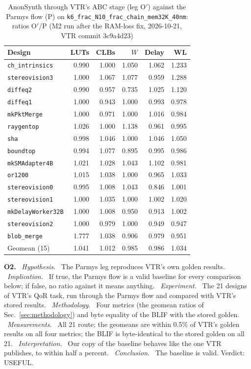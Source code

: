 \documentclass[conference]{IEEEtran}
\newcommand{\code}[1]{\texttt{#1}}
\newcommand{\argid}[1]{\par\smallskip\noindent\textbf{#1.}}
\newcommand{\ah}[1]{\ \textit{#1.}\ }
\begin{document}
\begin{table}[t]
\caption{AnonSynth through VTR's ABC stage (leg O$'$) against the Parmys flow (P) on
\code{k6\_frac\_N10\_frac\_chain\_mem32K\_40nm}: ratios O$'$/P (M2 run after the RAM-loss fix, 2026-10-21, VTR commit
3c9a4d23)}
\label{tab:m2}
\centering
\footnotesize
\setlength{\tabcolsep}{3.5pt}
\begin{tabular}{@{}lrrrrr@{}}
\toprule
Design & LUTs & CLBs & $W$ & Delay & WL \\
\midrule
\code{ch\_intrinsics} & 0.990 & 1.000 & 1.050 & 1.062 & 1.233 \\
\code{stereovision3} & 1.000 & 1.067 & 1.077 & 0.959 & 1.288 \\
\code{diffeq2} & 0.990 & 0.957 & 0.735 & 1.025 & 1.120 \\
\code{diffeq1} & 1.000 & 0.943 & 1.000 & 0.993 & 0.978 \\
\code{mkPktMerge} & 1.000 & 0.971 & 1.000 & 1.016 & 0.984 \\
\code{raygentop} & 1.026 & 1.000 & 1.138 & 0.961 & 0.995 \\
\code{sha} & 0.998 & 1.046 & 1.000 & 1.046 & 1.050 \\
\code{boundtop} & 0.994 & 1.077 & 0.895 & 0.995 & 0.986 \\
\code{mkSMAdapter4B} & 1.021 & 1.028 & 1.043 & 1.102 & 0.981 \\
\code{or1200} & 1.015 & 1.038 & 1.000 & 0.965 & 1.033 \\
\code{stereovision0} & 0.995 & 1.008 & 1.043 & 0.846 & 1.001 \\
\code{stereovision1} & 1.000 & 1.035 & 1.000 & 1.002 & 1.020 \\
\code{mkDelayWorker32B} & 1.000 & 1.008 & 0.950 & 0.913 & 1.002 \\
\code{stereovision2} & 1.000 & 0.979 & 1.000 & 0.949 & 0.947 \\
\code{blob\_merge} & 1.777 & 1.038 & 0.906 & 0.979 & 0.951 \\
\midrule
Geomean (15) & 1.041 & 1.012 & 0.985 & 0.986 & 1.034 \\
\bottomrule
\end{tabular}
\end{table}

\argid{O2}
\ah{Hypothesis} The Parmys leg reproduces VTR's own golden results.
\ah{Implication} If true, the Parmys flow is a valid baseline for every comparison below; if false, no ratio against it means anything.
\ah{Experiment} The 21 designs of VTR's QoR task, run through the Parmys flow and compared with VTR's stored results.
\ah{Methodology} Four metrics (the geomean ratios of Sec.~\ref{sec:methodology}) and byte equality of the BLIF with the stored golden.
\ah{Measurements} All 21 route; the geomeans are within 0.5\% of VTR's golden results on all four metrics; the BLIF is byte-identical to the stored golden on all 21.
\ah{Interpretation} Our copy of the baseline behaves like the one VTR publishes, to within half a percent.
\ah{Conclusion} The baseline is valid. Verdict: USEFUL.
\end{document}
